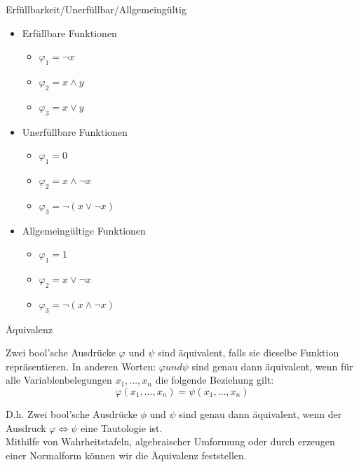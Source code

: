 \documentclass[12pt%
,aspectratio=169%
]{beamer}
\begin{document}
\begin{frame}{Erfüllbarkeit/Unerfüllbar/Allgemeingültig}
\begin{itemize}
	\item Erfüllbare Funktionen
	\begin{itemize}
		\item $\varphi_1 = \neg x$
		\item $\varphi_2 = x \land y$
		\item $\varphi_3 = x \lor y$
	\end{itemize}
	\item Unerfüllbare Funktionen
	\begin{itemize}
		\item $\varphi_1 = 0$
		\item $\varphi_2 = x \land \neg x$
		\item $\varphi_3 = \neg (x \lor \neg x)$
	\end{itemize}
	\item Allgemeingültige Funktionen
	\begin{itemize}
		\item $\varphi_1 = 1$
		\item $\varphi_2 = x \lor \neg x$
		\item $\varphi_3 = \neg (x \land \neg x)$
	\end{itemize}
\end{itemize}
\end{frame}

\begin{frame}{Äquivalenz}
\begin{definition}[Äquivalenz]
Zwei bool'sche Ausdrücke $\varphi$ und $\psi$ sind äquivalent, falls sie dieselbe Funktion repräsentieren. In anderen Worten: $\varphi und \psi$ sind genau dann äquivalent, wenn für alle Variablenbelegungen $x_1 , \ldots, x_n$ die folgende Beziehung gilt:
$$ \varphi (x_1,\ldots, x_n) = \psi(x_1, \ldots, x_n)$$
\end{definition}
D.h. Zwei bool'sche Ausdrücke $\phi$ und $\psi$ sind genau dann äquivalent, wenn der Ausdruck $\varphi \Leftrightarrow \psi$ eine Tautologie ist.\\
Mithilfe von Wahrheitstafeln, algebraischer Umformung oder durch erzeugen einer Normalform können wir die Äquivalenz feststellen.
\end{frame}
\end{document}
